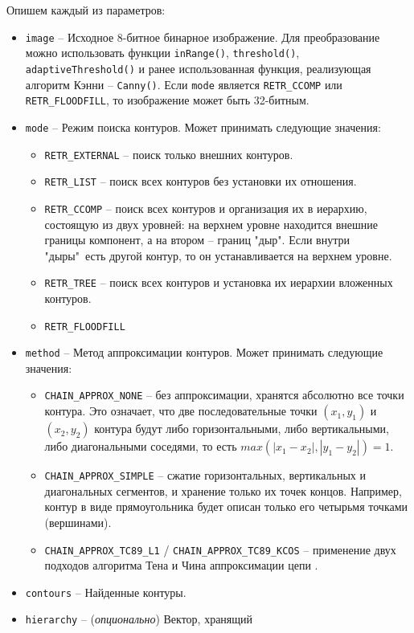 Опишем каждый из параметров:
\begin{itemize}
	\item {\tt image} -- Исходное 8-битное бинарное изображение.
Для преобразование можно использовать функции {\tt inRange()}, 
{\tt threshold()}, {\tt adaptiveThreshold()} и ранее использованная 
функция, реализующая алгоритм Кэнни -- {\tt Canny()}. Если {\tt mode}
является {\tt RETR\_CCOMP} или {\tt RETR\_FLOODFILL}, то изображение 
может быть 32-битным.
	\item {\tt mode} -- Режим поиска контуров. Может принимать 
следующие значения:
		\begin{itemize}
			\item {\tt RETR\_EXTERNAL} -- поиск только внешних
контуров.
			\item {\tt RETR\_LIST} -- поиск всех контуров без установки
их отношения.
			\item {\tt RETR\_CCOMP} -- поиск всех контуров и
организация их в иерархию, состоящую из двух уровней: на верхнем уровне
находится внешние границы компонент, а на втором -- границ "дыр". Если
внутри "дыры"\ есть другой контур, то он устанавливается на верхнем
уровне.
			\item {\tt RETR\_TREE} -- поиск всех контуров и установка
их иерархии вложенных контуров.
			\item {\tt RETR\_FLOODFILL}
		\end{itemize}
	\item {\tt method} -- Метод аппроксимации контуров. Может принимать
следующие значения:
		\begin{itemize}
			\item {\tt CHAIN\_APPROX\_NONE} -- без аппроксимации, 
хранятся абсолютно все точки контура. Это означает, что две 
последовательные точки $(x_1,y_1)$ и $(x_2,y_2)$ контура будут
либо горизонтальными, либо вертикальными, либо диагональными соседями, 
то есть $max(|x_1-x_2|, |y_1-y_2|) = 1$.
			\item {\tt CHAIN\_APPROX\_SIMPLE} -- сжатие горизонтальных, 
вертикальных и диагональных сегментов, и хранение только их точек
концов. Например, контур в виде прямоугольника будет описан только его
четырьмя точками (вершинами).
			\item {\tt CHAIN\_APPROX\_TC89\_L1} / 
{\tt CHAIN\_APPROX\_TC89\_KCOS} -- применение двух подходов алгоритма
Тена и Чина аппроксимации цепи \cite{ten-chin}.
		\end{itemize}
	\item {\tt contours} -- Найденные контуры.
	\item {\tt hierarchy} -- ({\it опционально})  Вектор, хранящий

\end{itemize}
